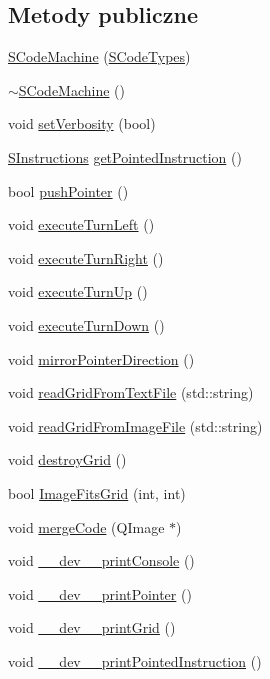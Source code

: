 \subsection*{Metody publiczne}
\begin{CompactItemize}
\item 
\hyperlink{classSCodeMachine_bb85f472be7c8e2112bbe5d6643f99b7}{SCodeMachine} (\hyperlink{senums_8h_1a2ae45552936d27425f99e1c187b043}{SCodeTypes})
\item 
\hyperlink{classSCodeMachine_67d39a3662fc2640aa506a581766a9b8}{$\sim$SCodeMachine} ()
\item 
void \hyperlink{classSCodeMachine_4a2d7edca4db9e3bd8942abc13f6c8ec}{setVerbosity} (bool)
\item 
\hyperlink{senums_8h_b1c3fa9dccd3f8afa81e14a98d9a7d1e}{SInstructions} \hyperlink{classSCodeMachine_3c851e80ec35cbebeb78ec8ceed8c5ca}{getPointedInstruction} ()
\item 
bool \hyperlink{classSCodeMachine_69a97f71f2a16f69f9daca1bf8433964}{pushPointer} ()
\item 
void \hyperlink{classSCodeMachine_d8415a221140a08a9383a595336cdf69}{executeTurnLeft} ()
\item 
void \hyperlink{classSCodeMachine_d48065e7bf42eef9e3a0f81fbb17f301}{executeTurnRight} ()
\item 
void \hyperlink{classSCodeMachine_f2867d02414db096844e4801f9895650}{executeTurnUp} ()
\item 
void \hyperlink{classSCodeMachine_26b7ba8981d08d594b0c37617aa85277}{executeTurnDown} ()
\item 
void \hyperlink{classSCodeMachine_2ce54a2d5f6399b501c5260b63317401}{mirrorPointerDirection} ()
\item 
void \hyperlink{classSCodeMachine_b906d8d6f1faf45d6d01e45e51b7cd65}{readGridFromTextFile} (std::string)
\item 
void \hyperlink{classSCodeMachine_6796d55fa4ae7bd8051b92a60d395d2a}{readGridFromImageFile} (std::string)
\item 
void \hyperlink{classSCodeMachine_54ad5c55c2afe66dedececed9846e5d1}{destroyGrid} ()
\item 
bool \hyperlink{classSCodeMachine_b4f7e9e538a378461a86418ea9dc1d5a}{ImageFitsGrid} (int, int)
\item 
void \hyperlink{classSCodeMachine_fdc2ddde59a89a474c7d478a391829ba}{mergeCode} (QImage $\ast$)
\item 
void \hyperlink{classSCodeMachine_29892f8f026e8dcd71ec99b9c593e022}{\_\-\_\-dev\_\-\_\-printConsole} ()
\item 
void \hyperlink{classSCodeMachine_b4c8492fda9fe21cc2620ede3630d852}{\_\-\_\-dev\_\-\_\-printPointer} ()
\item 
void \hyperlink{classSCodeMachine_0ea93dafdabff0ff080a24b6c8ef9ea1}{\_\-\_\-dev\_\-\_\-printGrid} ()
\item 
void \hyperlink{classSCodeMachine_6a725d341bffacccb53431f88c62b713}{\_\-\_\-dev\_\-\_\-printPointedInstruction} ()
\end{CompactItemize}



